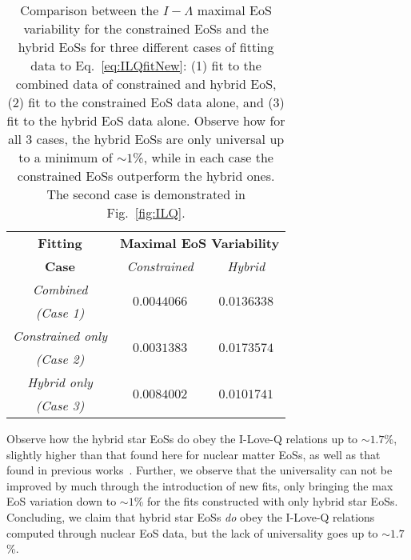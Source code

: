 \documentclass[prd,twocolumn,nofootinbib,superscriptaddress,amsmath,amssymb]{revtex4-1}
\begin{document}
\begin{table}
\centering
\caption{
Comparison between the $I-\Lambda$ maximal EoS variability for the constrained EoSs and the hybrid EoSs for three different cases of fitting data to Eq.~\ref{eq:ILQfitNew}: (1) fit to the combined data of constrained and hybrid EoS, (2) fit to the constrained EoS data alone, and (3) fit to the hybrid EoS data alone.
Observe how for all 3 cases, the hybrid EoSs are only universal up to a minimum of $\sim1$\%, while in each case the constrained EoSs outperform the hybrid ones.
The second case is demonstrated in Fig.~\ref{fig:ILQ}.
}\label{tab:hybridCompare}
\begin{tabular}{ c  || c c } 
 \hline
 \hline
 \textbf{Fitting} & \multicolumn{2}{c}{\textbf{Maximal EoS Variability}} \\
 \cline{2-3}
 \textbf{Case} &  \multicolumn{1}{c|}{\emph{Constrained}} & \emph{Hybrid}\\
 \hline
 \emph{Combined} &  \multirow{2}{*}{$0.0044066$} & \multirow{2}{*}{$0.0136338$}\\
 \emph{(Case 1)} & &\\
 \cline{1-1}
 \emph{Constrained only} & \multirow{2}{*}{$0.0031383$} & \multirow{2}{*}{$0.0173574$}\\
  \emph{(Case 2)} & &\\
  \cline{1-1}
 \emph{Hybrid only} & \multirow{2}{*}{$0.0084002$} & \multirow{2}{*}{$0.0101741$}\\
  \emph{(Case 3)} & &\\
  \cline{1-1}
\hline
\hline
\end{tabular}
\end{table}

Observe how the hybrid star EoSs do obey the I-Love-Q relations up to $\sim1.7$\%, slightly higher than that found here for nuclear matter EoSs, as well as that found in previous works~\cite{Yagi:ILQ}.
Further, we observe that the universality can not be improved by much through the introduction of new fits, only bringing the max EoS variation down to $\sim1$\% for the fits constructed with only hybrid star EoSs.
Concluding, we claim that hybrid star EoSs \emph{do} obey the I-Love-Q relations computed through nuclear EoS data, but the lack of universality goes up to $\sim1.7$\%. 

{}
\end{document}

